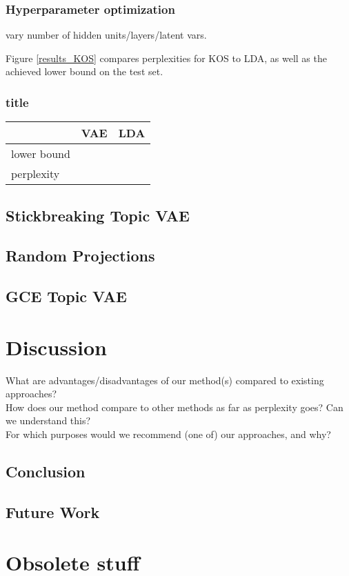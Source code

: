 \documentclass{report}
\begin{document}
	\subsection{Hyperparameter optimization}
	vary number of hidden units/layers/latent vars.
	
	Figure \ref{results_KOS} compares perplexities for KOS to LDA, as well as the achieved lower bound on the test set.
	
	\subsection{title}
	
	
	\begin{tabular}{l|l|l}
		& VAE & LDA  \\
		\hline
		lower bound & & \\
		\hline
		perplexity & & 
		\label{results_KOS}
	\end{tabular}
	
	\section{Stickbreaking Topic VAE}
	
	\section{Random Projections}
	\section{GCE Topic VAE}

\chapter{Discussion}
What are advantages/disadvantages of our method(s) compared to existing approaches?\\
How does our method compare to other methods as far as perplexity goes? Can we understand this?\\
For which purposes would we recommend (one of) our approaches, and why? \\
\section{Conclusion}
\section{Future Work}
\chapter{Obsolete stuff}
\end{document}
